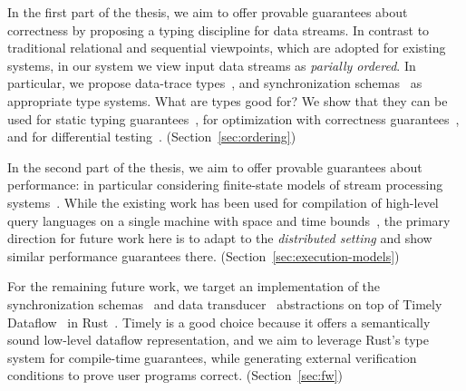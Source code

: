 In the first part of the thesis, we aim to offer provable guarantees
about correctness by proposing a typing discipline for data streams.
In contrast to traditional relational and sequential viewpoints, which are
adopted for existing systems, in our system we view input data streams as \emph{parially ordered}.
In particular, we propose data-trace types~,
and synchronization schemas~ as appropriate type systems.
What are types good for? We show that they can be used
for static typing guarantees~, for optimization with correctness guarantees~, and for differential testing~.
(Section~\ref{sec:ordering})

In the second part of the thesis, we aim to offer provable guarantees about performance: in particular considering finite-state models of stream processing systems~.
While the existing work has been used for compilation of high-level query languages on a single machine with space and time bounds~\cite{popl19,QRE,StreamQRE},
the primary direction for future work here is to adapt to the \emph{distributed setting} and show similar performance guarantees there.
(Section~\ref{sec:execution-models})

For the remaining future work, we target an implementation of the synchronization schemas~ and data transducer~ abstractions on top of Timely Dataflow~\cite{Timely,Naiad2013} in Rust~\cite{RustLang}.
Timely is a good choice because it offers a semantically sound low-level dataflow representation,
and we aim to leverage Rust's type system for compile-time guarantees,
while generating external verification conditions to prove user programs correct.
(Section~\ref{sec:fw})

